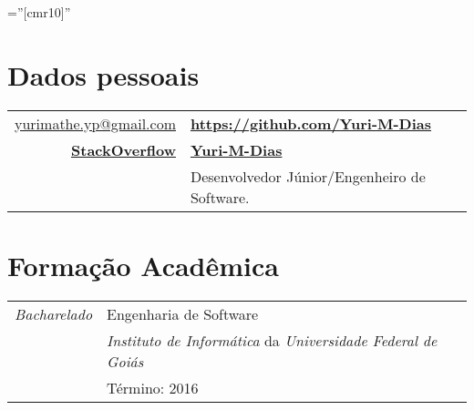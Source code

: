 \documentclass[a4paper,10pt]{article} %
\begin{document}
\pagestyle{empty} %

\font\fb=''[cmr10]'' %


\par{\bigskip\par} %

\section{Dados pessoais}

\begin{tabular}{rl}
	\href{mailto:yurimathe.yp@gmail.com}{yurimathe.yp@gmail.com}
	& \faGithub
	\href{https://github.com/Yuri-M-Dias}{\bf https://github.com/Yuri-M-Dias} \\
	\faStackOverflow \href{http://stackoverflow.com/users/3312701/yuri-m-dias}
	{\bf StackOverflow}
	& \href{https://github.com/Yuri-M-Dias}{\bf Yuri-M-Dias} \\
	& Desenvolvedor Júnior/Engenheiro de Software. \\
\end{tabular}


\section{Formação Acadêmica}

\begin{tabular}{r|p{11cm}}
	\emph{Bacharelado} & Engenharia de Software \\
	& \emph{Instituto de Informática} da \emph{Universidade Federal de Goiás} \\
	& Término: 2016\\
\end{tabular}

\end{document}
